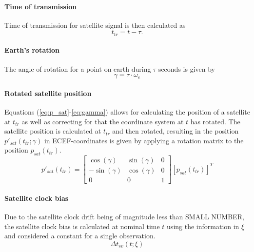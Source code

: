 \documentclass[]{article}
\begin{document}
\paragraph{Time of transmission}
Time of transmission for satellite signal is then calculated as 
\begin{equation}
t_{tr}=t-\tau.
\end{equation}
\paragraph{Earth's rotation}
The angle of rotation for a point on earth during $\tau$ seconds is given by 
\begin{equation}\label{eq:gamma}
\gamma=\tau\cdot\omega_e
\end{equation} 
\paragraph{Rotated satellite position}
Equations (\ref{eq:p_sat}-\ref{eq:gamma}) allows for calculating the position of a satellite at $t_{tr}$ as well as correcting for that the coordinate system at $t$ has rotated. The satellite position is calculated at $t_{tr}$ and then rotated, resulting in the position $p'_{sat}(t_{tr};\gamma)$ in ECEF-coordinates is given by applying a rotation matrix to the position $p_{sat}(t_{tr})$.
\begin{equation}\label{eq:coord_rotation}
p'_{sat}(t_{tr})=\begin{bmatrix} \cos(\gamma) &\sin(\gamma) &0\\  -\sin(\gamma) &\cos(\gamma)& 0\\ 0& 0 &1
\end{bmatrix}\left[p_{sat}(t_{tr})\right]^T
\end{equation}
\paragraph{Satellite clock bias}
Due to the satellite clock drift being of magnitude less than SMALL NUMBER, the satellite clock bias is calculated at nominal time $t$ using the information in $\xi$ and considered a constant for a single observation.
\begin{equation}
\Delta t_{sv}(t;\xi)
\end{equation}
\end{document}
